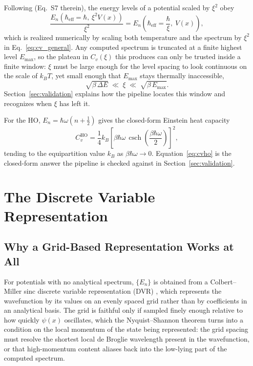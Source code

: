 \documentclass[10pt,conference]{IEEEtran}
\begin{document}
Following \cite{gelbwaser2018} (Eq.~S7 therein), the energy levels of a potential scaled by $\xi^2$ obey
\begin{equation}
\frac{E_n\!\left(\hbar_{\text{eff}}=\hbar,\ \xi^2 V(x)\right)}{\xi^2} = E_n\!\left(\hbar_{\text{eff}}=\frac{\hbar}{\xi},\ V(x)\right),
\label{eq:scaling}
\end{equation}
which is realized numerically by scaling both temperature and the spectrum by $\xi^2$ in Eq.~\eqref{eq:cv_general}. Any computed spectrum is truncated at a finite highest level $E_{\max}$, so the plateau in $C_v(\xi)$ this produces can only be trusted inside a finite window: $\xi$ must be large enough for the level spacing to look continuous on the scale of $k_BT$, yet small enough that $E_{\max}$ stays thermally inaccessible,
\begin{equation}
\sqrt{\beta\,\Delta E} \;\ll\; \xi \;\ll\; \sqrt{\beta\,E_{\max}}.
\label{eq:xiwindow}
\end{equation}
Section~\ref{sec:validation} explains how the pipeline locates this window and recognizes when $\xi$ has left it.

For the HO, $E_n=\hbar\omega(n+\tfrac12)$ gives the closed-form Einstein heat capacity
\begin{equation}
C_v^{\text{HO}} = \frac{1}{4}k_B\left[\beta\hbar\omega\,\operatorname{csch}\!\left(\frac{\beta\hbar\omega}{2}\right)\right]^2 ,
\label{eq:cvho}
\end{equation}
tending to the equipartition value $k_B$ as $\beta\hbar\omega\to0$. Equation~\eqref{eq:cvho} is the closed-form answer the pipeline is checked against in Section~\ref{sec:validation}.

\section{The Discrete Variable Representation}
\label{sec:dvr}

\subsection{Why a Grid-Based Representation Works at All}
For potentials with no analytical spectrum, $\{E_n\}$ is obtained from a Colbert--Miller sinc discrete variable representation (DVR) \cite{colbertmiller1992,lightcarrington2000}, which represents the wavefunction by its values on an evenly spaced grid rather than by coefficients in an analytical basis. The grid is faithful only if sampled finely enough relative to how quickly $\psi(x)$ oscillates, which the Nyquist--Shannon theorem turns into a condition on the local momentum of the state being represented: the grid spacing must resolve the shortest local de Broglie wavelength present in the wavefunction, or that high-momentum content aliases back into the low-lying part of the computed spectrum.
\end{document}
